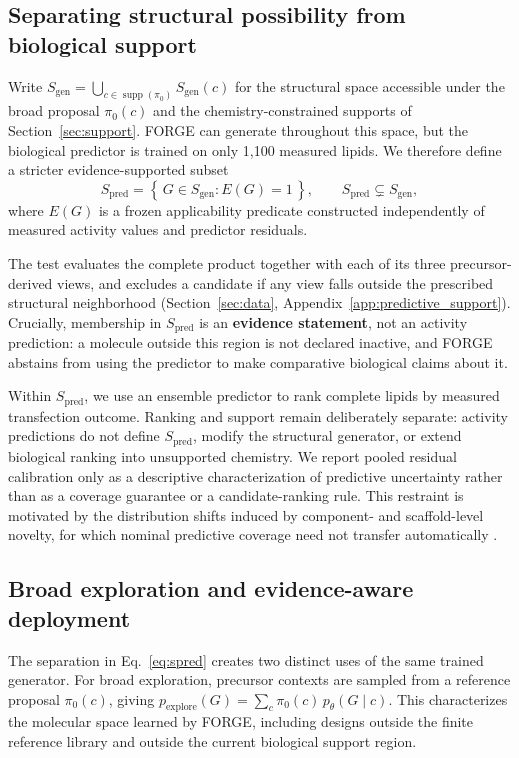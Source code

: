 \documentclass{article}
\newcommand{\MeasuredLipids}{1{,}100}
\newcommand{\Sgen}{\ensuremath{S_{\mathrm{gen}}}}
\newcommand{\Spred}{\ensuremath{S_{\mathrm{pred}}}}
\begin{document}
\subsection{Separating structural possibility from biological support}
\label{sec:pred-support}
Write $\Sgen = \bigcup_{c \in \operatorname{supp}(\pi_0)} \Sgen(c)$ for the structural space accessible
under the broad proposal $\pi_0(c)$ and the chemistry-constrained supports of
Section~\ref{sec:support}. FORGE can generate throughout this space, but the biological predictor is
trained on only \MeasuredLipids{} measured lipids. We therefore define a stricter evidence-supported
subset
%
\begin{equation}
\label{eq:spred}
\Spred = \left\{\, G \in \Sgen : E(G) = 1 \,\right\},
\qquad \Spred \subsetneq \Sgen,
\end{equation}
%
where $E(G)$ is a frozen applicability predicate constructed independently of measured activity values
and predictor residuals.

The test evaluates the complete product together with each of its three precursor-derived views, and
excludes a candidate if any view falls outside the prescribed structural neighborhood
(Section~\ref{sec:data}, Appendix~\ref{app:predictive_support}). Crucially, membership in \Spred{} is
an \textbf{evidence statement}, not an activity prediction: a molecule outside this region is not
declared inactive, and FORGE abstains from using the predictor to make comparative biological claims
about it.

Within \Spred{}, we use an ensemble predictor to rank complete lipids by measured transfection
outcome. Ranking and support remain deliberately separate: activity predictions do not define
\Spred{}, modify the structural generator, or extend biological ranking into unsupported chemistry. We
report pooled residual calibration only as a descriptive characterization of predictive uncertainty
rather than as a coverage guarantee or a candidate-ranking rule. This restraint is motivated by the
distribution shifts induced by component- and scaffold-level novelty, for which nominal predictive
coverage need not transfer automatically \citep{ai2024notall}.

\subsection{Broad exploration and evidence-aware deployment}
\label{sec:explore-deploy}
The separation in Eq.~\eqref{eq:spred} creates two distinct uses of the same trained generator. For
broad exploration, precursor contexts are sampled from a reference proposal $\pi_0(c)$,
giving $p_{\mathrm{explore}}(G) = \sum_c \pi_0(c)\, p_\theta(G \mid c)$. This characterizes the
molecular space learned by FORGE, including designs outside the finite reference library and outside
the current biological support region.
\end{document}
